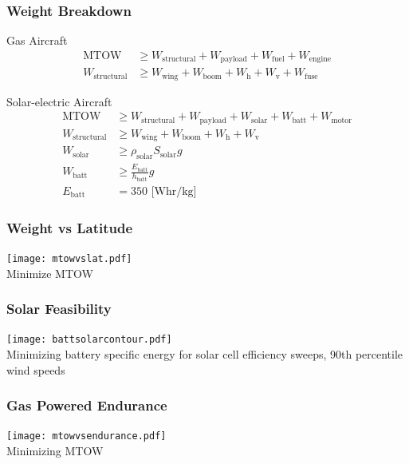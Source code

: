 \documentclass{beamer}
\begin{document}
\begin{frame}
    \frametitle{Weight Breakdown}

    Gas Aircraft
    \begin{align*}
        \text{MTOW} &\geq W_{\text{structural}}  + W_{\text{payload}} + W_{\text{fuel}} + W_{\text{engine}} \\
        W_{\text{structural}} &\geq W_{\text{wing}} + W_{\text{boom}} + W_{\text{h}}+ W_{\text{v}} + W_{\text{fuse}}
    \end{align*}

    Solar-electric Aircraft
    \begin{align*}
        \text{MTOW} &\geq W_{\text{structural}} + W_{\text{payload}} + W_{\text{solar}} + W_{\text{batt}} + W_{\text{motor}} \\
        W_{\text{structural}} &\geq W_{\text{wing}} + W_{\text{boom}} + W_{\text{h}}+ W_{\text{v}} \\
        W_{\text{solar}} &\geq \rho_{\text{solar}} S_{\text{solar}} g \\
        W_{\text{batt}} &\geq \frac{E_{\text{batt}}}{h_{\text{batt}}} g \\
        E_{\text{batt}} &= 350 \text{ [Whr/kg]}
    \end{align*}

\end{frame}

\begin{frame}
    \frametitle{Weight vs Latitude}

    \begin{center}
    \texttt{[image: mtowvslat.pdf]} \\
    Minimize MTOW
    \end{center}

\end{frame}

\begin{frame}
    \frametitle{Solar Feasibility}

    \begin{center}
    \texttt{[image: battsolarcontour.pdf]} \\
    Minimizing battery specific energy for solar cell efficiency sweeps, 90th percentile wind speeds
    \end{center}

\end{frame}

\begin{frame}
    \frametitle{Gas Powered Endurance}

    \begin{center}
    \texttt{[image: mtowvsendurance.pdf]} \\
    Minimizing MTOW
    \end{center}

\end{frame}
\end{document}

